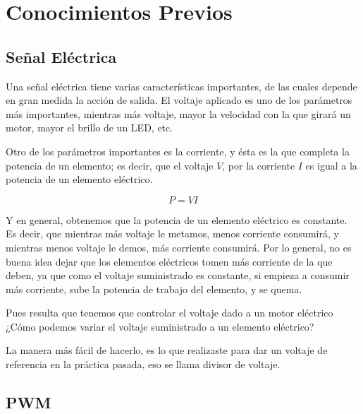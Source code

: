
\section{Conocimientos Previos}


	\subsection{Señal Eléctrica}

		Una señal eléctrica tiene varias características importantes, de las cuales depende en gran medida la acción de salida. El voltaje aplicado es uno de los parámetros más importantes, mientras más voltaje, mayor la velocidad con la que girará un motor, mayor el brillo de un LED, etc.

		Otro de los parámetros importantes es la corriente, y ésta es la que completa la potencia de un elemento; es decir, que el voltaje $V$, por la corriente $I$ es igual a la potencia de un elemento eléctrico.

		\begin{equation}
			P = V I
		\end{equation}

		Y en general, obtenemos que la potencia de un elemento eléctrico es constante. Es decir, que mientras más voltaje le metamos, menos corriente consumirá, y mientras menos voltaje le demos, más corriente consumirá. Por lo general, no es buena idea dejar que los elementos eléctricos tomen más corriente de la que deben, ya que como el voltaje suministrado es constante, si empieza a consumir más corriente, sube la potencia de trabajo del elemento, y se quema.

		Pues resulta que tenemos que controlar el voltaje dado a un motor eléctrico ¿Cómo podemos variar el voltaje suministrado a un elemento eléctrico?

		La manera más fácil de hacerlo, es lo que realizaste para dar un voltaje de referencia en la práctica pasada, eso se llama divisor de voltaje.


	\subsection{PWM}

